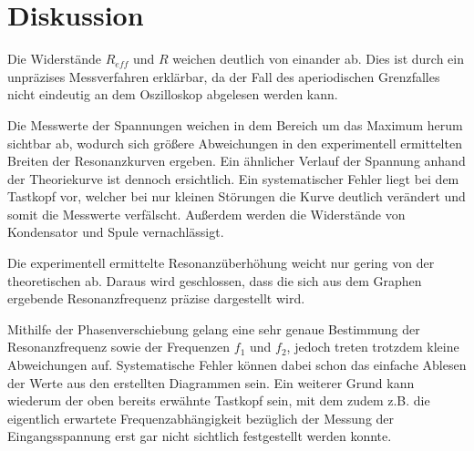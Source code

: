 \section{Diskussion}
\label{sec:Diskussion}

Die Widerstände $R_{eff}$ und $R$ weichen deutlich von einander ab. Dies ist durch ein unpräzises Messverfahren erklärbar, da
der Fall des aperiodischen Grenzfalles nicht eindeutig an dem Oszilloskop abgelesen werden kann.

Die Messwerte der Spannungen weichen in dem Bereich um das Maximum herum sichtbar ab, wodurch sich größere Abweichungen
in den experimentell ermittelten Breiten der Resonanzkurven ergeben. Ein ähnlicher Verlauf der Spannung anhand
der Theoriekurve ist dennoch ersichtlich.
Ein systematischer Fehler liegt bei dem Tastkopf vor,
welcher bei nur kleinen Störungen die Kurve deutlich verändert und somit die Messwerte verfälscht. Außerdem
werden die Widerstände von Kondensator und Spule vernachlässigt.


Die experimentell ermittelte Resonanzüberhöhung weicht nur gering von der theoretischen ab. Daraus wird
geschlossen, dass die sich aus dem Graphen ergebende Resonanzfrequenz präzise dargestellt wird.

Mithilfe der Phasenverschiebung gelang eine sehr genaue Bestimmung der Resonanzfrequenz sowie der Frequenzen $f_1$ und $f_2$, jedoch treten
trotzdem kleine Abweichungen auf. Systematische
Fehler können dabei schon das einfache Ablesen der Werte aus den erstellten Diagrammen sein. Ein weiterer Grund
kann wiederum der oben bereits erwähnte Tastkopf sein, mit dem zudem z.B. die eigentlich
erwartete Frequenzabhängigkeit bezüglich der Messung der Eingangsspannung erst gar nicht
sichtlich festgestellt werden konnte.
